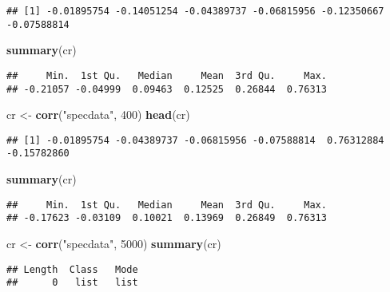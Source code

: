 \documentclass[
]{article}
\newenvironment{Shaded}{\begin{snugshade}}{\end{snugshade}}
\newcommand{\DecValTok}[1]{\textcolor[rgb]{0.00,0.00,0.81}{#1}}
\newcommand{\KeywordTok}[1]{\textcolor[rgb]{0.13,0.29,0.53}{\textbf{#1}}}
\newcommand{\NormalTok}[1]{#1}
\newcommand{\StringTok}[1]{\textcolor[rgb]{0.31,0.60,0.02}{#1}}
\begin{document}
\begin{verbatim}
## [1] -0.01895754 -0.14051254 -0.04389737 -0.06815956 -0.12350667 -0.07588814
\end{verbatim}

\begin{Shaded}
\begin{Highlighting}[]
\KeywordTok{summary}\NormalTok{(cr)}
\end{Highlighting}
\end{Shaded}

\begin{verbatim}
##     Min.  1st Qu.   Median     Mean  3rd Qu.     Max. 
## -0.21057 -0.04999  0.09463  0.12525  0.26844  0.76313
\end{verbatim}

\begin{Shaded}
\begin{Highlighting}[]
\NormalTok{cr <-}\StringTok{ }\KeywordTok{corr}\NormalTok{(}\StringTok{"specdata"}\NormalTok{, }\DecValTok{400}\NormalTok{)}
\KeywordTok{head}\NormalTok{(cr)}
\end{Highlighting}
\end{Shaded}

\begin{verbatim}
## [1] -0.01895754 -0.04389737 -0.06815956 -0.07588814  0.76312884 -0.15782860
\end{verbatim}

\begin{Shaded}
\begin{Highlighting}[]
\KeywordTok{summary}\NormalTok{(cr)}
\end{Highlighting}
\end{Shaded}

\begin{verbatim}
##     Min.  1st Qu.   Median     Mean  3rd Qu.     Max. 
## -0.17623 -0.03109  0.10021  0.13969  0.26849  0.76313
\end{verbatim}

\begin{Shaded}
\begin{Highlighting}[]
\NormalTok{cr <-}\StringTok{ }\KeywordTok{corr}\NormalTok{(}\StringTok{"specdata"}\NormalTok{, }\DecValTok{5000}\NormalTok{)}
\KeywordTok{summary}\NormalTok{(cr)}
\end{Highlighting}
\end{Shaded}

\begin{verbatim}
## Length  Class   Mode 
##      0   list   list
\end{verbatim}
\end{document}
